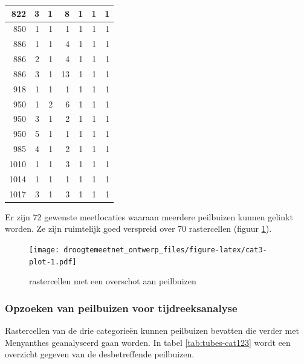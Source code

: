 \documentclass[11pt,]{book}
\begin{document}
\begin{table}
\begin{tabular}[t]{r|r|r|r|r|r|r}
\hline
822 & 3 & 1 & 8 & 1 & 1 & 1\\
\hline
850 & 1 & 1 & 1 & 1 & 1 & 1\\
\hline
886 & 1 & 1 & 4 & 1 & 1 & 1\\
\hline
886 & 2 & 1 & 4 & 1 & 1 & 1\\
\hline
886 & 3 & 1 & 13 & 1 & 1 & 1\\
\hline
918 & 1 & 1 & 1 & 1 & 1 & 1\\
\hline
950 & 1 & 2 & 6 & 1 & 1 & 1\\
\hline
950 & 3 & 1 & 2 & 1 & 1 & 1\\
\hline
950 & 5 & 1 & 1 & 1 & 1 & 1\\
\hline
985 & 4 & 1 & 2 & 1 & 1 & 1\\
\hline
1010 & 1 & 1 & 3 & 1 & 1 & 1\\
\hline
1014 & 1 & 1 & 1 & 1 & 1 & 1\\
\hline
1017 & 3 & 1 & 3 & 1 & 1 & 1\\
\hline
\end{tabular}
\end{table}

Er zijn 72 gewenste meetlocaties waaraan meerdere peilbuizen kunnen
gelinkt worden. Ze zijn ruimtelijk goed verspreid over 70 rastercellen
(figuur \ref{fig:cat3-plot}).

\begin{figure}
\centering
\texttt{[image: droogtemeetnet\_ontwerp\_files/figure-latex/cat3-plot-1.pdf]}
\caption{\label{fig:cat3-plot}rastercellen met een overschot aan peilbuizen}
\end{figure}

\subsubsection{Opzoeken van peilbuizen voor
tijdreeksanalyse}\label{opzoeken-pb}

Rastercellen van de drie categorieën kunnen peilbuizen bevatten die
verder met Menyanthes geanalyseerd gaan worden. In tabel
\ref{tab:tubes-cat123} wordt een overzicht gegeven van de desbetreffende
peilbuizen.
\end{document}
